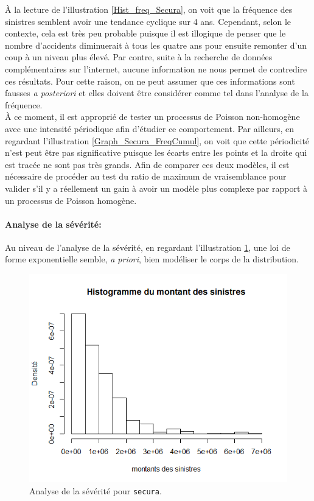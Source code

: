 		À la lecture de l'illustration \ref{Hist_freq_Secura}, on voit que la fréquence des sinistres semblent avoir une tendance cyclique sur 4 ans. Cependant, selon le contexte, cela est très peu probable puisque il est illogique de penser que le nombre d'accidents diminuerait à tous les quatre ans pour ensuite remonter d'un coup à un niveau plus élevé. Par contre, suite à la recherche de données complémentaires sur l'internet, aucune information ne nous permet de contredire ces résultats. Pour cette raison, on ne peut assumer que ces informations sont fausses \textit{a posteriori} et elles doivent être considérer comme tel dans l'analyse de la fréquence.\\
		
		À ce moment, il est approprié de tester un processus de Poisson non-homogène avec une intensité périodique afin d'étudier ce comportement. Par ailleurs, en regardant l'illustration \ref{Graph_Secura_FreqCumul}, on voit que cette périodicité n'est peut être pas significative puisque les écarts entre les points et la droite qui est tracée ne sont pas très grands. Afin de comparer ces deux modèles, il est nécessaire de procéder au test du ratio de maximum de vraisemblance pour valider s'il y a réellement un gain à avoir un modèle plus complexe par rapport à un processus de Poisson homogène.
		
		\paragraph{Analyse de la sévérité:}
		Au niveau de l'analyse de la sévérité, en regardant l'illustration \ref{Hist_Severite_Secura}, une loi de forme exponentielle semble, \textit{a priori}, bien modéliser le corps de la distribution. 
		
		\begin{figure}[H]
		\begin{center}
		\includegraphics[scale=0.45]{Graphiques/Hist_Severite_Secura} 
		\renewcommand{\figurename}{Illustration}
		\caption{Analyse de la sévérité pour \texttt{secura}.} \label{Hist_Severite_Secura}
		\end{center}
		\end{figure}
		
